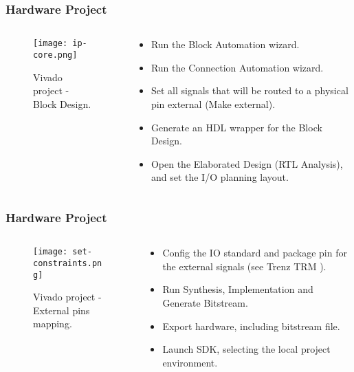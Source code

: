 \begin{frame}
	\frametitle{Hardware Project}
	\begin{columns}
		\begin{column}{0.5\textwidth}
			\begin{figure}
				\texttt{[image: ip-core.png]}
				\caption{Vivado project - Block Design.}\label{fig:ip-core}
			\end{figure}
		\end{column}
		\begin{column}{0.5\textwidth}
			\begin{itemize}
				\item Run the Block Automation wizard.
				\item Run the Connection Automation wizard.
				\item Set all signals that will be routed to a physical pin external (Make external).
				\item Generate an HDL wrapper for the Block Design.
				\item Open the Elaborated Design (RTL Analysis), and set the I/O planning layout.
			\end{itemize}
		\end{column}
	\end{columns}
\end{frame}

\begin{frame}
	\frametitle{Hardware Project}
	\begin{columns}
		\begin{column}{0.5\textwidth}
			\begin{figure}
				\texttt{[image: set-constraints.png]}
				\caption{Vivado project - External pins mapping.}\label{fig:set-constraints}
			\end{figure}
		\end{column}
		\begin{column}{0.5\textwidth}
			\begin{itemize}
				\item Config the IO standard and package pin for the external signals (see Trenz TRM \cite{zynq-trm}).
				\item Run Synthesis, Implementation and Generate Bitstream.
				\item Export hardware, including bitstream file.
				\item Launch SDK, selecting the local project environment.
			\end{itemize}
		\end{column}
	\end{columns}
\end{frame}

